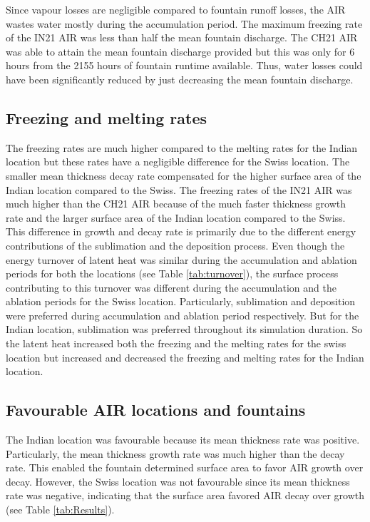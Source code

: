 \documentclass[utf8]{frontiersSCNS}
\begin{document}
Since vapour losses are negligible compared to fountain runoff losses, the AIR wastes water mostly during the
accumulation period. The maximum freezing rate of the IN21 AIR was less than half the mean fountain discharge. The
CH21 AIR was able to attain the mean fountain discharge provided but this was only for 6 hours from the 2155
hours of fountain runtime available. Thus, water losses could have been significantly reduced by just decreasing
the mean fountain discharge.

\subsection{Freezing and melting rates}

The freezing rates are much higher compared to the melting rates for the Indian location but these rates have a
negligible difference for the Swiss location. The smaller mean thickness decay rate compensated for the higher
surface area of the Indian location compared to the Swiss. The freezing rates of the IN21 AIR was much higher
than the CH21 AIR because of the much faster thickness growth rate and the larger surface area of the Indian
location compared to the Swiss. This difference in growth and decay rate is primarily due to the different
energy contributions of the sublimation and the deposition process. Even though the energy turnover of latent
heat was similar during the accumulation and ablation periods for both the locations (see Table
\ref{tab:turnover}), the surface process contributing to this turnover was different during the accumulation and
the ablation periods for the Swiss location. Particularly, sublimation and deposition were preferred during
accumulation and ablation period respectively. But for the Indian location, sublimation was preferred throughout
its simulation duration. So the latent heat increased both the freezing and the melting rates for the swiss
location but increased and decreased the freezing and melting rates for the Indian location.

\subsection{Favourable AIR locations and fountains}

The Indian location was favourable because its mean thickness rate was positive. Particularly, the mean
thickness growth rate was much higher than the decay rate. This enabled the fountain determined surface area to
favor AIR growth over decay. However, the Swiss location was not favourable since its mean thickness rate was
negative, indicating that the surface area favored AIR decay over growth (see Table \ref{tab:Results}).
\end{document}
